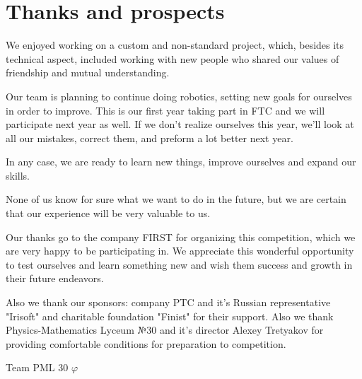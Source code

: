 
\section{Thanks and prospects} 
    We enjoyed working on a custom and non-standard project, which, besides its technical aspect, included working with new people who shared our values of friendship and mutual understanding. 
    
    Our team is planning to continue doing robotics, setting new goals for ourselves in order to improve. This is our first year taking part in FTC and we will participate next year as well. If we don't realize ourselves this year, we'll look at all our mistakes, correct them, and preform a lot better next year.
   
    In any case, we are ready to learn new things, improve ourselves and expand our skills. 
    
    None of us know for sure what we want to do in the future, but we are certain that our experience will be very valuable to us. 
    
    Our thanks go to the company FIRST for organizing this competition, which we are very happy to be participating in. We appreciate this wonderful opportunity to test ourselves and learn something new and wish them success and growth in their future endeavors.
    
    Also we thank our sponsors: company PTC and it's Russian representative "Irisoft" and charitable foundation "Finist" for their support. Also we thank Physics-Mathematics Lyceum №30 and it's director Alexey Tretyakov for providing comfortable conditions for preparation to competition.
   
    
    \begin{center}
      Team PML 30 ${\varphi}$
    \end{center}
    
    \vspace{0.5em}
    
